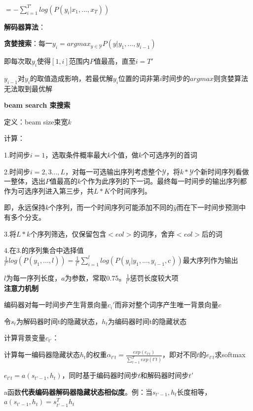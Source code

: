 \documentclass[UTF8]{ctexart}
\begin{document}
  \quad \quad $ = -\sum_{i=1}^{T'}log(P(y_i | x_1, ..., x_T))$
  
  \textbf{解码器算法}：

  \quad \textbf{贪婪搜索}：每一$y_i = argmax_{y\in \mathcal{Y} }P(y|y_1, ..., y_{i-1})$

  \quad \quad 即每次取$y_i$使得$[1, i]$范围内$P$值最高，直至$i = T'$

  \quad \quad $y_{i-1}$对$y_i$的取值造成影响，若最优解$y_i$位置的词非第$i$时间步的$argmax$则贪婪算法无法取到最优解

  \quad \textbf{beam search 束搜索}
  
  \quad \quad 定义：beam size束宽$k$

  \quad \quad 计算：
  
  \quad \quad \quad 1.时间步$i = 1$，选取条件概率最大$k$个值，做$k$个可选序列的首词
  
  \quad \quad \quad 2.时间步$i = 2,3...,L$，对每一可选输出序列考虑整个$\mathcal{Y} $，将$k*\mathcal{Y} $个新时间序列看做一整体，选出$P$值最高的$k$个作为此序列的下一词。最终每一时间步的输出序列都作为可选序列进入第三步，共$L*K$个时间序列。
  
  \quad \quad \quad \quad 即，永远保持$k$个序列，而一个时间序列可能添加不同的$\hat{y}$而在下一时间步预测中有多个分支。
  
  \quad \quad \quad 3.将$L*k$个序列筛选，仅保留包含$<eol>$的词序，舍弃$<eol>$后的词
  
  \quad \quad \quad 4.在3.的序列集合中选择值$\frac{1}{l^a}log(P(y_1, ...,l))=\frac{1}{l^a}\sum_{i=1}^llog(P(y_i|y_1, ..., y_{i-1}, c))$最大序列作为输出
  
  \quad \quad \quad \quad $l$为每一序列长度，$a$为参数，常取0.75。$\frac{1}{l^a}$惩罚长度较大项\\
\textbf{注意力机制}

  编码器对每一时间步产生背景向量$c_i'$而非对整个词序产生唯一背景向量$c$

  令$s_t$为解码器时间t的隐藏状态，$h_t$为编码器时间t的隐藏状态

  计算背景变量$c_{t'}$：

  \quad 计算每一编码器隐藏状态$h_t$的权重$\alpha_{t't} = \frac{exp(e_{t't})}{\sum_{t=1}^{T}exp(t't)}$，即对不同$t$的$e_{t't}$求softmax

  \quad \quad $e_{t't} = a(s_{t'-1}, h_t)$，同时基于编码器时间步$t$和解码器时间步$t'$

  \quad \quad \quad a函数\textbf{代表编码器解码器隐藏状态相似度}。例：当$s_{t'-1}, h_t$长度相等，$a(s_{t'-1}, h_t) = s_{t'-1}^Th_t$
\end{document}
